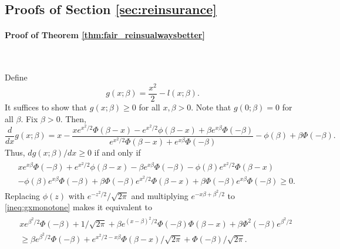 \documentclass[fleqn,mnsc,nonblindrev]{informs4}
\begin{document}
\subsection{Proofs of Section \ref{sec:reinsurance}}

\paragraph{Proof of Theorem \ref{thm:fair_reinsualwaysbetter}}
\

Define 
\[
g(x;\beta)=\frac{x^2}{2}-l(x;\beta).
\]
It suffices to show that $g(x;\beta)\geq0$ for all $x,\beta>0.$ Note that $g(0;\beta)=0$ for all $\beta.$ Fix $\beta>0.$ Then, 
\[
\frac{d}{dx}g(x;\beta)=x-\frac{xe^{x^2/2}\Phi(\beta-x)-e^{x^2/2}\phi(\beta-x)+\beta e^{x\beta}\Phi(-\beta)}{e^{x^2/2}\Phi(\beta-x)+e^{x\beta}\Phi(-\beta)}-\phi(\beta)+\beta\Phi(-\beta).
\]
Thus, $dg(x;\beta)/dx\geq 0$ if and only if
\begin{align}
\begin{split}
&xe^{x\beta}\Phi(-\beta)+e^{x^2/2}\phi(\beta-x)-\beta e^{x\beta}\Phi(-\beta)-\phi(\beta)e^{x^2/2}\Phi(\beta-x)\\
&-\phi(\beta)e^{x\beta}\Phi(-\beta)+\beta\Phi(-\beta)e^{x^2/2}\Phi(\beta-x)+\beta\Phi(-\beta)e^{x\beta}\Phi(-\beta)\geq 0.
\end{split}\label{ineq:gxmonotone}
\end{align}
Replacing $\phi(z)$ with $e^{-z^2/2}/\sqrt{2\pi}$ and multiplying $e^{-x\beta+\beta^2/2}$ to \eqref{ineq:gxmonotone} makes it equivalent to 
\begin{align}
\begin{split}
&xe^{\beta^2/2}\Phi(-\beta)+1/\sqrt{2\pi}+\beta e^{(x-\beta)^2/2}\Phi(-\beta)\Phi(\beta-x)+\beta\Phi^2(-\beta)e^{\beta^2/2}\\
&\geq\beta e^{\beta^2/2}\Phi(-\beta)+e^{x^2/2-x\beta}\Phi(\beta-x)/\sqrt{2\pi}+\Phi(-\beta)/\sqrt{2\pi}.\label{ineq:g(xbeta)proof}
\end{split}
\end{align}
\end{document}
